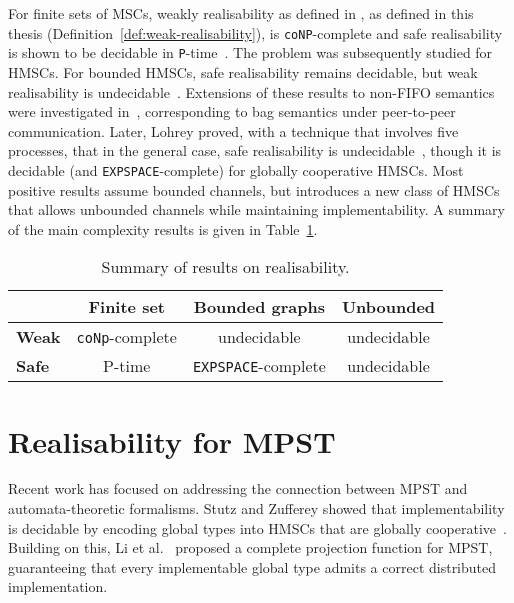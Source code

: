 For finite sets of MSCs, weakly realisability as defined in 
\cite{alur2005realizability}, as defined in this thesis 
(Definition~\ref{def:weak-realisability}), is \verb|coNP|-complete and safe 
realisability is shown to be decidable in \verb|P|-time~\cite{alur2005realizability}.
The problem was subsequently studied for HMSCs. For bounded HMSCs, safe realisability 
remains decidable, but weak realisability 
is undecidable~\cite{alur2005realizability}. Extensions of these results to non-FIFO 
semantics were investigated in~\cite{morin2002recognizable}, corresponding 
to bag semantics under peer-to-peer communication. 
Later, Lohrey proved, with a technique that involves five processes, 
that in the general case, safe realisability 
is undecidable~\cite{lohrey2003realizability}, though it is decidable (and 
\verb|EXPSPACE|-complete) for globally cooperative HMSCs. %
Most positive results assume bounded channels, but \cite{bollig2025high} introduces 
a new class of HMSCs that allows unbounded channels while maintaining implementability.
A summary of the main complexity results is given in Table~\ref{tab:realisability}.

\begin{table}[!ht]
	\centering
	\begin{tabular}{|l|c|c|c|}
		\hline
		& \textbf{Finite set} & \textbf{Bounded graphs} & \textbf{Unbounded} \\
		\hline
		\textbf{Weak} & \verb|coNp|-complete & undecidable & undecidable \\
		\hline
		\textbf{Safe} & P-time & \verb|EXPSPACE|-complete & undecidable \\
		\hline
	\end{tabular}
	\caption{Summary of results on realisability.}
	\label{tab:realisability}
\end{table}

\section{Realisability for MPST}

Recent work has focused on addressing the connection between MPST 
and automata-theoretic formalisms. Stutz and Zufferey 
showed that implementability is decidable by encoding global types 
into HMSCs that are globally cooperative~\cite{stutz2022comparing,stutz2023asynchronous}. 
Building on this, Li et al.~\cite{li2023complete} proposed a complete 
projection function for MPST, guaranteeing that every implementable 
global type admits a correct distributed implementation.

